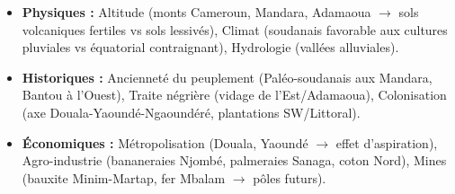 \documentclass[11pt]{article}
\begin{document}
\begin{aretenir}
\begin{itemize}
    \item \textbf{Physiques :} Altitude (monts Cameroun, Mandara, Adamaoua $\to$ sols volcaniques fertiles vs sols lessivés), Climat (soudanais favorable aux cultures pluviales vs équatorial contraignant), Hydrologie (vallées alluviales).
    \item \textbf{Historiques :} Ancienneté du peuplement (Paléo-soudanais aux Mandara, Bantou à l'Ouest), Traite négrière (vidage de l'Est/Adamaoua), Colonisation (axe Douala-Yaoundé-Ngaoundéré, plantations SW/Littoral).
    \item \textbf{Économiques :} Métropolisation (Douala, Yaoundé $\to$ effet d'aspiration), Agro-industrie (bananeraies Njombé, palmeraies Sanaga, coton Nord), Mines (bauxite Minim-Martap, fer Mbalam $\to$ pôles futurs).
\end{itemize}
\end{aretenir}
\end{document}
